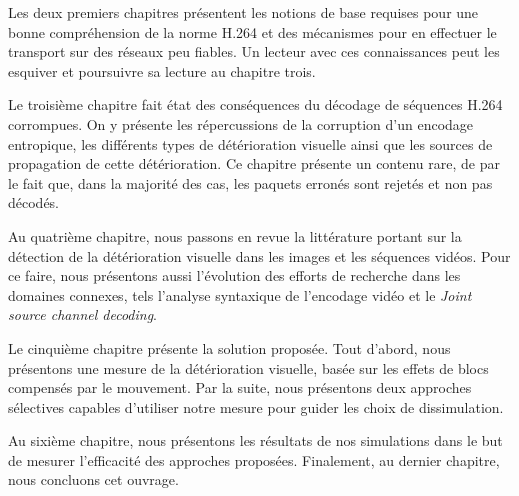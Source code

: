 Les deux premiers chapitres présentent les notions de base requises pour une
bonne compréhension de la norme H.264 et des mécanismes pour en effectuer le
transport sur des réseaux peu fiables. Un lecteur avec ces connaissances peut
les esquiver et poursuivre sa lecture au chapitre trois.

Le troisième chapitre fait état des conséquences du décodage de séquences H.264
corrompues. On y présente les répercussions de la corruption d'un encodage
entropique, les différents types de détérioration visuelle ainsi que les sources
de propagation de cette détérioration. Ce chapitre présente un contenu rare, de
par le fait que, dans la majorité des cas, les paquets erronés sont rejetés et
non pas décodés.

Au quatrième chapitre, nous passons en revue la littérature portant sur la
détection de la détérioration visuelle dans les images et les séquences vidéos.
Pour ce faire, nous présentons aussi l'évolution des efforts de recherche dans
les domaines connexes, tels l'analyse syntaxique de l'encodage vidéo et le
\textit{Joint source channel decoding}.

Le cinquième chapitre présente la solution proposée. Tout d'abord, nous
présentons une mesure de la détérioration visuelle, basée sur les effets de
blocs compensés par le mouvement. Par la suite, nous présentons deux approches
sélectives capables d'utiliser notre mesure pour guider les choix de
dissimulation.

Au sixième chapitre, nous présentons les résultats de nos simulations dans le
but de mesurer l'efficacité des approches proposées. Finalement, au dernier
chapitre, nous concluons cet ouvrage.